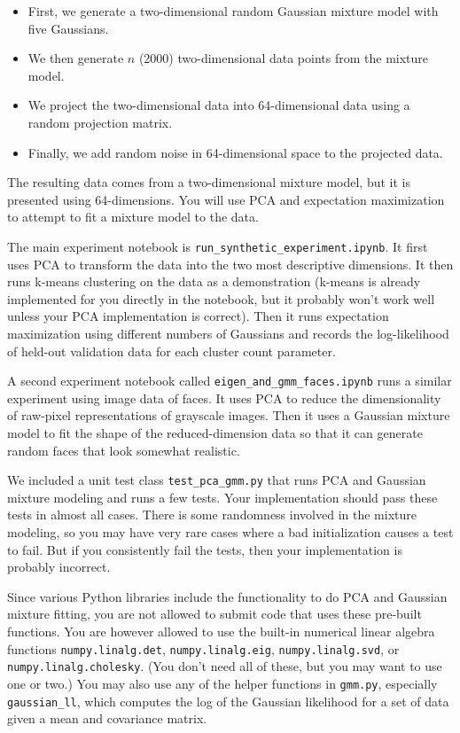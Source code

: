 \documentclass[10pt]{article}
\begin{document}
\begin{itemize}

\item First, we generate a two-dimensional random Gaussian mixture model with five Gaussians.

\item We then generate $n$ (2000) two-dimensional data points from the mixture model.

\item We project the two-dimensional data into 64-dimensional data using a random projection matrix.

\item Finally, we add random noise in 64-dimensional space to the projected data.

\end{itemize}

The resulting data comes from a two-dimensional mixture model, but it is presented using 64-dimensions. You will use PCA and expectation maximization to attempt to fit a mixture model to the data.

The main experiment notebook is \texttt{run\_synthetic\_experiment.ipynb}. It first uses PCA to transform the data into the two most descriptive dimensions. It then runs k-means clustering on the data as a demonstration (k-means is already implemented for you directly in the notebook, but it probably won't work well unless your PCA implementation is correct). Then it runs expectation maximization using different numbers of Gaussians and records the log-likelihood of held-out validation data for each cluster count parameter. 

A second experiment notebook called \texttt{eigen\_and\_gmm\_faces.ipynb} runs a similar experiment using image data of faces. It uses PCA to reduce the dimensionality of raw-pixel representations of grayscale images. Then it uses a Gaussian mixture model to fit the shape of the reduced-dimension data so that it can generate random faces that look somewhat realistic.

We included a unit test class \texttt{test\_pca\_gmm.py} that runs PCA and Gaussian mixture modeling and runs a few tests. Your implementation should pass these tests in almost all cases. There is some randomness involved in the mixture modeling, so you may have very rare cases where a bad initialization causes a test to fail. But if you consistently fail the tests, then your implementation is probably incorrect.

Since various Python libraries include the functionality to do PCA and Gaussian mixture fitting, you are not allowed to submit code that uses these pre-built functions. You are however allowed to use the built-in numerical linear algebra functions \texttt{numpy.linalg.det}, \texttt{numpy.linalg.eig}, \texttt{numpy.linalg.svd}, or \texttt{numpy.linalg.cholesky}. (You don't need all of these, but you may want to use one or two.) You may also use any of the helper functions in \texttt{gmm.py}, especially \texttt{gaussian\_ll}, which computes the log of the Gaussian likelihood for a set of data given a mean and covariance matrix.
\end{document}

